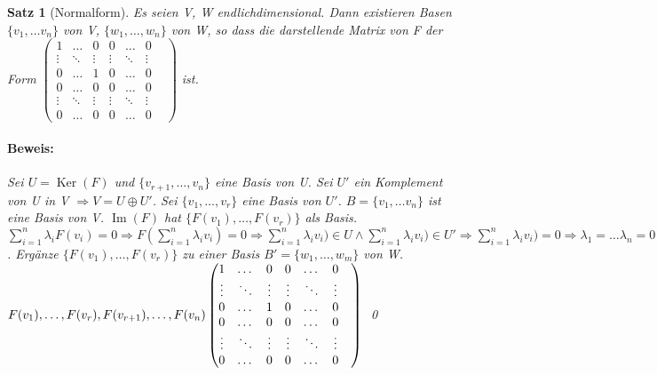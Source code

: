 \documentclass{report}
\newcommand{\lb}{\lambda}
\DeclareMathOperator{\Ima}{Im}
\DeclareMathOperator{\Ker}{Ker}
\theoremstyle{customrem}
\theoremstyle{customdef}
\newtheorem{satz}[definition]{Satz}
\renewenvironment{proof}{\paragraph{Beweis: }}{\qed}
\theoremstyle{customenv}
\begin{document}
\begin{satz}[Normalform]
  Es seien V, W endlichdimensional. Dann existieren Basen \(\{v_1, \dots v_n\}\)
   von V, \(\{w_1, \dots, w_n\}\) von W, so dass die darstellende Matrix von F
   der Form
  \(
    \begin{pmatrix}
      1      & \dots  & 0      & 0      & \dots  & 0\\
      \vdots & \ddots & \vdots & \vdots & \ddots & \vdots\\
      0      & \dots  & 1      & 0      & \dots  & 0\\
      0      & \dots  & 0      & 0      & \dots  & 0\\
      \vdots & \ddots & \vdots & \vdots & \ddots & \vdots\\
      0      & \dots  & 0      & 0      & \dots  & 0 & 
    \end{pmatrix}
  \) ist.
  \begin{proof}
    Sei \(U = \Ker(F)\) und \(\{v_{r+1}, \dots, v_n\}\) eine Basis von
    U. Sei \(U'\) ein Komplement von U in V \(\Rightarrow V = U \oplus U'\).
    Sei \(\{v_1, \dots, v_r\}\) eine Basis von \(U'\).
    \(B = \{v_1, \dots v_n\}\) ist eine Basis von V. \(\Ima(F)\) hat
    \(\{F(v_1), \dots, F(v_r)\}\) als Basis.\\
    \(
      \sum_{i=1}^n \lb_i F(v_i) = 0
      \Rightarrow F(\sum_{i=1}^n \lb_i v_i) = 0
      \Rightarrow \sum_{i=1}^n \lb_i v_i) \in U
                  \land \sum_{i=1}^n \lb_i v_i) \in U'
      \Rightarrow \sum_{i=1}^n \lb_i v_i) = 0
      \Rightarrow \lb_1 = \dots \lb_n = 0
    \).
    Erg\"anze \(\{F(v_1), \dots, F(v_r)\}\) zu einer Basis
    \(B' = \{w_1, \dots, w_m\}\) von W.
    \(
      F(v_1), \dots, F(v_r), F(v_{r+1}), \dots, F(v_n)\\
      \begin{pmatrix}
        1      & \dots  & 0      & 0      & \dots  & 0\\
        \vdots & \ddots & \vdots & \vdots & \ddots & \vdots\\
        0      & \dots  & 1      & 0      & \dots  & 0\\
        0      & \dots  & 0      & 0      & \dots  & 0\\
        \vdots & \ddots & \vdots & \vdots & \ddots & \vdots\\
        0      & \dots  & 0      & 0      & \dots  & 0 & 
      \end{pmatrix}
    \)
  \end{proof}
\end{satz}
\end{document}
